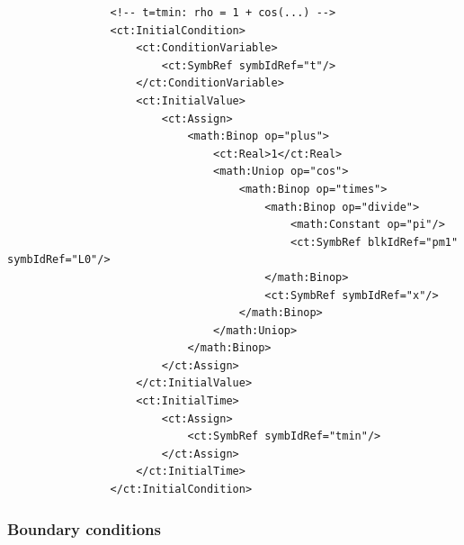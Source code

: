 \lstset{language=XML}
\begin{lstlisting}
                <!-- t=tmin: rho = 1 + cos(...) -->
                <ct:InitialCondition>
                    <ct:ConditionVariable>
                        <ct:SymbRef symbIdRef="t"/>
                    </ct:ConditionVariable>
                    <ct:InitialValue>
                        <ct:Assign>
                            <math:Binop op="plus">
                                <ct:Real>1</ct:Real>
                                <math:Uniop op="cos">
                                    <math:Binop op="times">
                                        <math:Binop op="divide">
                                            <math:Constant op="pi"/>
                                            <ct:SymbRef blkIdRef="pm1" symbIdRef="L0"/>
                                        </math:Binop>
                                        <ct:SymbRef symbIdRef="x"/>
                                    </math:Binop>
                                </math:Uniop>
                            </math:Binop>
                        </ct:Assign>
                    </ct:InitialValue>
                    <ct:InitialTime>
                        <ct:Assign>
                            <ct:SymbRef symbIdRef="tmin"/>
                        </ct:Assign>
                    </ct:InitialTime>
                </ct:InitialCondition>
\end{lstlisting}

\subsubsection*{Boundary conditions}

